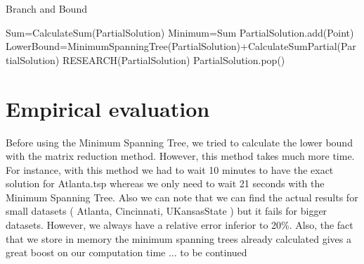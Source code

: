 \documentclass[12pt]{article}
\begin{document}
\begin{algorithm}
  \caption{Branch and Bound}\label{euclid}
  \begin{algorithmic}[1]
	\State Sum=CalculateSum(PartialSolution)
	      \State Minimum=Sum
	\EndIf
      \EndIf
	      \State PartialSolution.add(Point)
	      \State LowerBound=MinimumSpanningTree(PartialSolution)+CalculateSumPartial(PartialSolution)
		\State RESEARCH(PartialSolution)
	      \EndIf
	       \State PartialSolution.pop()
	\EndIf
      \EndFor
    \EndFunction
  \end{algorithmic}
\end{algorithm}

\section{Empirical evaluation}

Before using the Minimum Spanning Tree, we tried to calculate the lower bound with the matrix reduction method. However, this method takes much more time. For instance, with this method we had to wait 10 minutes to have the exact solution for Atlanta.tsp whereas we only need to wait 21 seconds with the Minimum Spanning Tree. Also we can note that we can find the actual results for small datasets ( Atlanta, Cincinnati, UKansasState ) but it fails for bigger datasets. However, we always have a relative error inferior to 20\%. Also, the fact that we store in memory the minimum spanning trees already calculated gives a great boost on our computation time ... to be continued
\end{document}

